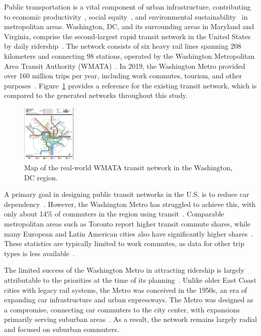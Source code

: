 \documentclass[sigconf,nonacm]{acmart}
\begin{document}
Public transportation is a vital component of urban infrastructure, contributing to economic productivity~\cite{lit:us_transit_policy}, social equity~\cite{lit:equity}, and environmental sustainability~\cite{lit:us_transit_policy} in metropolitan areas. Washington, DC, and its surrounding areas in Maryland and Virginia, comprise the second-largest rapid transit network in the United States by daily ridership~\cite{lit:wmata_stats}. The network consists of six heavy rail lines spanning 208 kilometers and connecting 98 stations, operated by the Washington Metropolitan Area Transit Authority (WMATA)~\cite{lit:wmata_stats}. In 2019, the Washington Metro provided over 160 million trips per year, including work commutes, tourism, and other purposes~\cite{lit:wmata_stats}. Figure~\ref{fig:wmata} provides a reference for the existing transit network, which is compared to the generated networks throughout this study. 
\begin{figure}[ht]
    \centering
    \includegraphics[width=0.23\textwidth]{./img/wmata.png}
    \caption{Map of the real-world WMATA transit network in the Washington, DC region.}
    \label{fig:wmata}
\end{figure}

A primary goal in designing public transit networks in the U.S. is to reduce car dependency~\cite{lit:us_transit_policy}. However, the Washington Metro has struggled to achieve this, with only about 14\% of commuters in the region using transit~\cite{lit:commute_stats}. Comparable metropolitan areas such as Toronto report higher transit commute shares, while many European and Latin American cities also have significantly higher shares~\cite{lit:toronto}. These statistics are typically limited to work commutes, as data for other trip types is less available~\cite{lit:commute_stats}.

The limited success of the Washington Metro in attracting ridership is largely attributable to the priorities at the time of its planning~\cite{lit:wmata_history}. Unlike older East Coast cities with legacy rail systems, the Metro was conceived in the 1950s, an era of expanding car infrastructure and urban expressways. The Metro was designed as a compromise, connecting car commuters to the city center, with expansions primarily serving suburban areas~\cite{lit:wmata_history}. As a result, the network remains largely radial and focused on suburban commuters.
\end{document}

